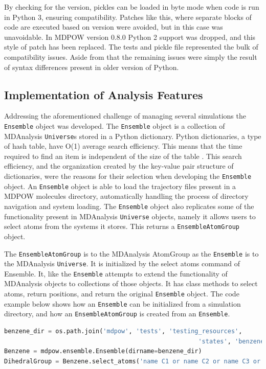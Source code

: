\documentclass{article}[letterpaper, margins=1in, 12pt]
\begin{document}
By checking for the version, pickles can be loaded in byte mode when code is run in Python 3, ensuring compatibility. Patches like this, where separate blocks of code are executed based on version were avoided, but in this case was unavoidable. In MDPOW version 0.8.0 Python 2 support was dropped, and this style of patch has been replaced. The tests and pickle file represented the bulk of compatibility issues. Aside from that the remaining issues were simply the result of syntax differences present in older version of Python.

\subsection{Implementation of Analysis Features}

Addressing the aforementioned challenge of managing several simulations the \texttt{Ensemble} object was developed. The \texttt{Ensemble} object is a collection of MDAnalysis \texttt{Universe}s stored in a Python dictionary. Python dictionaries, a type of hash table, have O(1) average search efficiency. This means that the time required to find an item is independent of the size of the table \cite{cormen_introduction_2009}. This search efficiency, and the organization created by the key-value pair structure of dictionaries, were the reasons for their selection when developing the \texttt{Ensemble} object. An \texttt{Ensemble} object is able to load the trajectory files present in a MDPOW molecules directory, automatically handling the process of  directory navigation and system loading.  The \texttt{Ensemble} object also replicates some of the functionality present in MDAnalysis \texttt{Universe} objects, namely it allows users to select atoms from the systems it stores. This returns a \texttt{EnsembleAtomGroup}  object.

The \texttt{EnsembleAtomGroup}  is to the MDAnalysis AtomGroup as the \texttt{Ensemble} is to the MDAnalysis \texttt{Universe}. It is initialized by the select atoms command of Ensemble. It, like the \texttt{Ensemble} attempts to extend the functionality of MDAnalysis objects to collections of those objects. It has class methods to select atoms, return positions, and return the original \texttt{Ensemble} object. The code example below shows how an \texttt{Ensemble} can be initialized from a simulation directory, and how an \texttt{EnsembleAtomGroup} is created from an \texttt{Ensemble}.

\begin{lstlisting}[language=Python]
benzene_dir = os.path.join('mdpow', 'tests', 'testing_resources',
													 'states', 'benzene')
Benzene = mdpow.ensemble.Ensemble(dirname=benzene_dir)
DihedralGroup = Benzene.select_atoms('name C1 or name C2 or name C3 or name C4')
\end{lstlisting}
\end{document}
